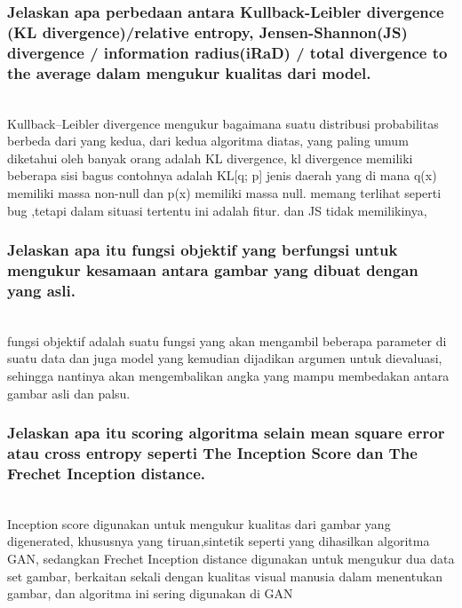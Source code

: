 \subsubsection{Jelaskan apa perbedaan antara Kullback-Leibler divergence (KL divergence)/relative entropy, Jensen-Shannon(JS) divergence / information radius(iRaD) / total divergence to the average dalam mengukur kualitas dari model.}
\hfill\\
Kullback–Leibler divergence mengukur bagaimana suatu distribusi probabilitas berbeda dari yang kedua, dari kedua algoritma diatas, yang paling umum diketahui oleh banyak orang adalah KL divergence, kl divergence memiliki beberapa sisi bagus contohnya adalah KL[q; p] jenis daerah yang di mana q(x) memiliki massa non-null dan p(x) memiliki massa null. memang terlihat seperti bug ,tetapi dalam situasi tertentu ini adalah fitur. dan JS tidak memilikinya,

\subsubsection{Jelaskan apa itu fungsi objektif yang berfungsi untuk mengukur kesamaan antara gambar yang dibuat dengan yang asli.} 
\hfill\\
fungsi objektif adalah suatu fungsi yang akan mengambil beberapa parameter di suatu data dan juga model yang kemudian dijadikan argumen untuk dievaluasi, sehingga nantinya akan mengembalikan angka yang mampu membedakan antara gambar asli dan palsu.

\subsubsection{Jelaskan apa itu scoring algoritma selain mean square error atau cross entropy seperti The Inception Score dan The Frechet Inception distance.} 
\hfill\\
Inception score digunakan untuk mengukur kualitas dari gambar yang digenerated, khususnya yang tiruan,sintetik seperti yang dihasilkan algoritma GAN, sedangkan Frechet Inception distance digunakan untuk mengukur dua data set gambar, berkaitan sekali dengan kualitas visual manusia dalam menentukan gambar, dan algoritma ini sering digunakan di GAN
